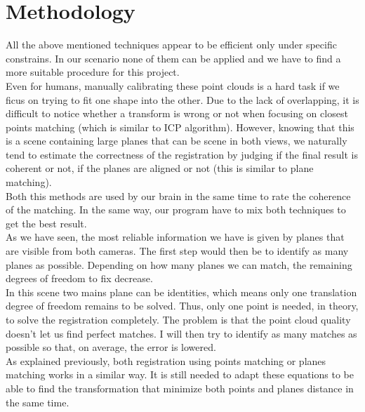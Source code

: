 
\chapter{Methodology}

All the above mentioned techniques appear to be efficient only under specific constrains. In our scenario none of them can be applied and we have to find a more suitable procedure for this project. \\
Even for humans, manually calibrating these point clouds is a hard task if we ficus on trying to fit one shape into the other. Due to the lack of overlapping, it is difficult to notice whether a transform is wrong or not when focusing on closest points matching (which is similar to ICP algorithm). However, knowing that this is a scene containing large planes that can be scene in both views, we naturally tend to estimate the correctness of the registration by judging if the final result is coherent or not, if the planes are aligned or not (this is similar to plane matching). \\
Both this methods are used by our brain in the same time to rate the coherence of the matching. In the same way, our program have to mix both techniques to get the best result. \\
\newline
As we have seen, the most reliable information we have is given by planes that are visible from both cameras. The first step would then be to identify as many planes as possible. Depending on how many planes we can match, the remaining degrees of freedom to fix decrease. \\
In this scene two mains plane can be identities, which means only one translation degree of freedom remains to be solved. Thus, only one point is needed, in theory, to solve the registration completely. The problem is that the point cloud quality doesn't let us find perfect matches. I will then try to identify as many matches as possible so that, on average, the error is lowered. \\
\newline
As explained previously, both registration using points matching or planes matching works in a similar way. It is still needed to adapt these equations to be able to find the transformation that minimize both points and planes distance in the same time. 
